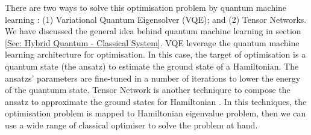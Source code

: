 There are two ways to solve this optimisation problem by quantum machine learning \cite{mugelDynamicPortfolioOptimization2022}: (1) Variational Quantum Eigensolver (VQE); and (2) Tensor Networks.
We have discussed the general idea behind quantum machine learning in section \ref{Sec: Hybrid Quantum - Classical System}.
VQE leverage the quantum machine learning architecture for optimisation.
In this case, the target of optimisation is a quantum state (the ansatz) to estimate the ground state of a Hamiltonian.
The ansatzs' parameters are fine-tuned in a number of iterations to lower the energy of the quantunm state.
Tensor Network is another techniqure to compose the ansatz to approximate the ground states for Hamiltonian \cite{orusTensorNetworksComplex2019}.
In this techniques, the optimisation problem is mapped to Hamiltonian eigenvalue problem, then we can use a wide range of classical optimiser to solve the problem at hand.
